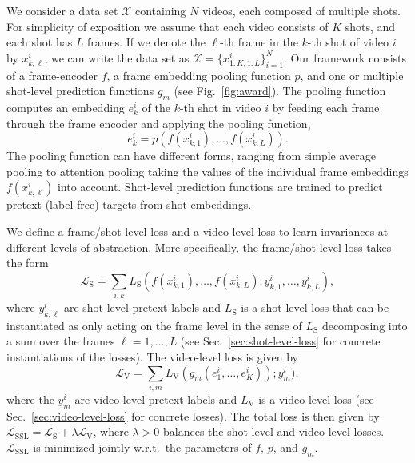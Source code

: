 \documentclass[10pt,twocolumn,letterpaper]{article}
\newcommand{\xikl}{x^i_{k,\ell}}
\newcommand{\xiKL}{x^i_{1:K,1:L}}
\newcommand{\eik}{e^i_k}
\newcommand{\eione}{e^i_1}
\newcommand{\eiK}{e^i_K}
\newcommand{\xikone}{x^i_{k,1}}
\newcommand{\yikL}{y^i_{k,L}}
\newcommand{\yikone}{y^i_{k,1}}
\newcommand{\yikl}{y^i_{k,\ell}}
\newcommand{\xikL}{x^i_{k,L}}
\newcommand{\yim}{y^i_m}
\newcommand{\ls}{L_\text{S}}
\newcommand{\lv}{L_\text{V}}
\newcommand{\Ls}{\mathcal L_\text{S}}
\newcommand{\Lv}{\mathcal L_\text{V}}
\newcommand{\Lssl}{\mathcal L_\text{SSL}}
\newcommand{\gm}{g_m}
\begin{document}
We consider a data set $\mathcal X$ containing $N$ videos, each composed of multiple shots. For simplicity of exposition we assume that each video consists of $K$ shots, and each shot has $L$ frames. If we denote the $\ell$-th frame in the $k$-th shot of video $i$ by $\xikl$, we can write the data set as $\mathcal X = \{\xiKL\}_{i=1}^N$. Our framework consists of a frame-encoder $f$, a frame embedding pooling function $p$, and one or multiple shot-level prediction functions $\gm$ (see Fig.~\ref{fig:award}). The pooling function computes an embedding $\eik$ of the $k$-th shot in video $i$ by feeding each frame through the frame encoder and applying the pooling function,
\begin{equation*}
\eik = p(f(\xikone), \ldots, f(\xikL)).
\end{equation*}
The pooling function can have different forms, ranging from simple average pooling to attention pooling taking the values of the individual frame embeddings $f(\xikl)$ into account. Shot-level prediction functions are trained to predict pretext (label-free) targets from shot embeddings.

We define a frame/shot-level loss and a video-level loss to learn invariances at different levels of abstraction. More specifically, the frame/shot-level loss takes the form
\begin{equation*}
    \Ls = \sum_{i,k} \ls(f(\xikone), \ldots, f(\xikL); \yikone, \ldots, \yikL),
\end{equation*}
where $\yikl$ are shot-level pretext labels and $\ls$ is a shot-level loss that can be instantiated as only acting on the frame level in the sense of $\ls$ decomposing into a sum over the frames $\ell=1,\ldots,L$ (see Sec.~\ref{sec:shot-level-loss} for concrete instantiations of the losses). The video-level loss is given by
\begin{equation} \label{eq:Lv}
    \Lv = \sum_{i,m} \lv(\gm(\eione, \ldots, \eiK)); \yim),
\end{equation}
where the $\yim$ are video-level pretext labels and $\lv$ is a video-level loss (see Sec.~\ref{sec:video-level-loss} for concrete losses). The total loss is then given by $\Lssl = \Ls + \lambda \Lv$, where $\lambda >0$ balances the shot level and video level losses. $\Lssl$ is minimized jointly w.r.t.\ the parameters of $f$, $p$, and $\gm$. 
\end{document}
